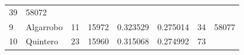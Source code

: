 \documentclass[]{article}
\begin{document}
\begin{longtable}[]{@{}llllllll@{}}
\begin{minipage}[t]{0.11\columnwidth}
39\strut
\end{minipage} & \begin{minipage}[t]{0.10\columnwidth}\raggedright
58072\strut
\end{minipage}\tabularnewline
\begin{minipage}[t]{0.03\columnwidth}\raggedright
9\strut
\end{minipage} & \begin{minipage}[t]{0.09\columnwidth}\raggedright
Algarrobo\strut
\end{minipage} & \begin{minipage}[t]{0.14\columnwidth}\raggedright
11\strut
\end{minipage} & \begin{minipage}[t]{0.13\columnwidth}\raggedright
15972\strut
\end{minipage} & \begin{minipage}[t]{0.10\columnwidth}\raggedright
0.323529\strut
\end{minipage} & \begin{minipage}[t]{0.09\columnwidth}\raggedright
0.275014\strut
\end{minipage} & \begin{minipage}[t]{0.11\columnwidth}\raggedright
34\strut
\end{minipage} & \begin{minipage}[t]{0.10\columnwidth}\raggedright
58077\strut
\end{minipage}\tabularnewline
\begin{minipage}[t]{0.03\columnwidth}\raggedright
10\strut
\end{minipage} & \begin{minipage}[t]{0.09\columnwidth}\raggedright
Quintero\strut
\end{minipage} & \begin{minipage}[t]{0.14\columnwidth}\raggedright
23\strut
\end{minipage} & \begin{minipage}[t]{0.13\columnwidth}\raggedright
15960\strut
\end{minipage} & \begin{minipage}[t]{0.10\columnwidth}\raggedright
0.315068\strut
\end{minipage} & \begin{minipage}[t]{0.09\columnwidth}\raggedright
0.274992\strut
\end{minipage} & \begin{minipage}[t]{0.11\columnwidth}\raggedright
73\strut
\end{minipage} & \begin{minipage}[t]{0.10\columnwidth}\raggedright

\end{minipage}
\end{longtable}
\end{document}
